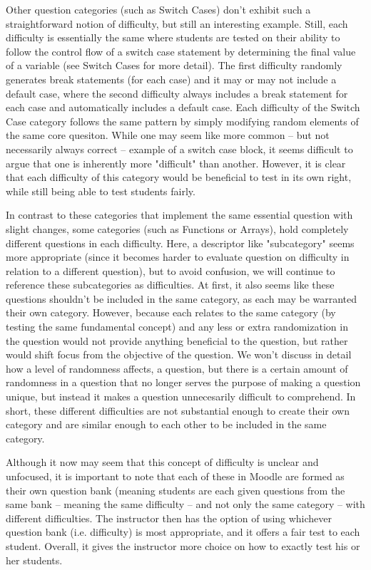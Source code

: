 \documentclass{article}
\begin{document}
Other question categories (such as Switch Cases) don't exhibit such a straightforward
notion of difficulty, but still an interesting example. Still, each difficulty is essentially the same where students are tested on their
ability to follow the control flow of a switch case statement by determining the final value of a variable (see Switch Cases for more detail).
The first difficulty randomly generates break statements (for each case) and it may or may not include a default case, where the second difficulty
always includes a break statement for each case and automatically includes a default case. Each difficulty of the Switch Case category follows the
same pattern by simply modifying random elements of the same core quesiton. While one may seem like more common -- but not necessarily always
correct -- example of a switch case block, it seems difficult to argue that one is inherently more "difficult" than another. However, it is clear
that each difficulty of this category would be beneficial to test in its own right, while still being able to test students fairly.

In contrast to these categories that implement the same essential question with slight changes, some categories (such as Functions
or Arrays), hold completely different questions in each difficulty. Here, a descriptor like "subcategory" seems more appropriate
(since it becomes harder to evaluate question on difficulty in relation to a different question), but
to avoid confusion, we will continue to reference these subcategories as difficulties. At first, it also seems like these questions shouldn't
be included in the same category, as each may be warranted their own category. However, because each relates to the same category
(by testing the same fundamental concept) and any less or extra randomization in the question would not provide anything beneficial to
the question, but rather would shift focus from the objective of the question. We won't discuss in detail how a level of randomness affects,
a question, but there is a certain amount of randomness in a question that no longer serves the purpose of making a question unique,
but instead it makes a question unnecesarily difficult to comprehend. In short, these different difficulties are not substantial enough to
create their own category and are similar enough to each other to be included in the same category.

Although it now may seem that this concept of difficulty is unclear and unfocused, it is important to note that each of these in Moodle are
formed as their own question bank (meaning students are each given questions from the same bank -- meaning the same difficulty -- and not only
the same category -- with different difficulties. The instructor then has the option of using whichever question bank (i.e. difficulty) is most appropriate,
and it offers a fair test to each student. Overall, it gives the instructor more choice on how to exactly test his or her students.
\end{document}
